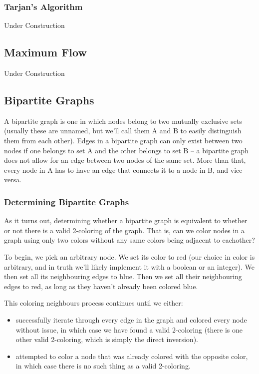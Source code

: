 \subsubsection{Tarjan's Algorithm}

Under Construction

\subsection{Maximum Flow}

Under Construction

\subsection{Bipartite Graphs}

A bipartite graph is one in which nodes belong to two mutually exclusive sets (usually these are unnamed, but we'll call them A and B to easily distinguish them from each other). Edges in a bipartite graph can only exist between two nodes if one belongs to set A and the other belongs to set B -- a bipartite graph does not allow for an edge between two nodes of the same set. More than that, every node in A has to have an edge that connects it to a node in B, and vice versa.

\subsubsection{Determining Bipartite Graphs}

As it turns out, determining whether a bipartite graph is equivalent to whether or not there is a valid 2-coloring of the graph. That is, can we color nodes in a graph using only two colors without any same colors being adjacent to eachother?

To begin, we pick an arbitrary node. We set its color to red (our choice in color is arbitrary, and in truth we'll likely implement it with a boolean or an integer). We then set all its neighbouring edges to blue. Then we set all their neighbouring edges to red, as long as they haven't already been colored blue.

This coloring neighbours process continues until we either:
\begin{itemize}
\item successfully iterate through every edge in the graph and colored every node without issue, in which case we have found a valid 2-coloring (there is one other valid 2-coloring, which is simply the direct inversion).
\item attempted to color a node that was already colored with the opposite color, in which case there is no such thing as a valid 2-coloring.
\end{itemize}

